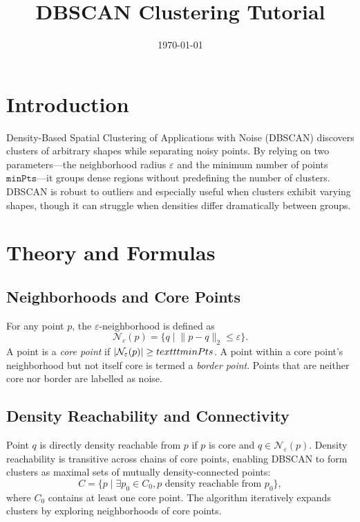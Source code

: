 ﻿\documentclass[12pt]{article}
\title{DBSCAN Clustering Tutorial}
\author{}
\date{\today}
\begin{document}
\maketitle

\section{Introduction}
Density-Based Spatial Clustering of Applications with Noise (DBSCAN) discovers clusters of arbitrary shapes while separating noisy points. By relying on two parameters---the neighborhood radius \(\varepsilon\) and the minimum number of points \(\texttt{minPts}\)---it groups dense regions without predefining the number of clusters. DBSCAN is robust to outliers and especially useful when clusters exhibit varying shapes, though it can struggle when densities differ dramatically between groups.

\section{Theory and Formulas}
\subsection{Neighborhoods and Core Points}
For any point \(p\), the \(\varepsilon\)-neighborhood is defined as
\begin{equation}
\mathcal{N}_\varepsilon(p) = \{ q \mid \lVert p - q \rVert_2 \le \varepsilon \}.
\end{equation}
A point is a \emph{core point} if \(|\mathcal{N}_\varepsilon(p)| \ge \\texttt{minPts}\). A point within a core point's neighborhood but not itself core is termed a \emph{border point}. Points that are neither core nor border are labelled as noise.

\subsection{Density Reachability and Connectivity}
Point \(q\) is directly density reachable from \(p\) if \(p\) is core and \(q \in \mathcal{N}_\varepsilon(p)\). Density reachability is transitive across chains of core points, enabling DBSCAN to form clusters as maximal sets of mutually density-connected points:
\begin{equation}
C = \{ p \mid \exists p_0 \in C_0, p \text{ density reachable from } p_0 \},
\end{equation}
where \(C_0\) contains at least one core point. The algorithm iteratively expands clusters by exploring neighborhoods of core points.
\end{document}
